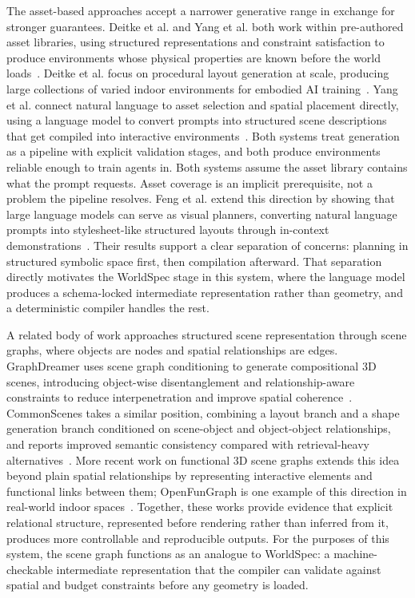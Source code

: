 \documentclass[12pt]{article}
\begin{document}
The asset-based approaches accept a narrower generative range in exchange for stronger guarantees. Deitke et al. and Yang et al. both work within pre-authored asset libraries, using structured representations and constraint satisfaction to produce environments whose physical properties are known before the world loads~\cite{Deitke_2022_NeurIPS, Yang_2024_CVPR}. Deitke et al. focus on procedural layout generation at scale, producing large collections of varied indoor environments for embodied AI training~\cite{Deitke_2022_NeurIPS}. Yang et al. connect natural language to asset selection and spatial placement directly, using a language model to convert prompts into structured scene descriptions that get compiled into interactive environments~\cite{Yang_2024_CVPR}. Both systems treat generation as a pipeline with explicit validation stages, and both produce environments reliable enough to train agents in. Both systems assume the asset library contains what the prompt requests. Asset coverage is an implicit prerequisite, not a problem the pipeline resolves. Feng et al. extend this direction by showing that large language models can serve as visual planners, converting natural language prompts into stylesheet-like structured layouts through in-context demonstrations~\cite{Feng_2023_NeurIPS_LayoutGPT}. Their results support a clear separation of concerns: planning in structured symbolic space first, then compilation afterward. That separation directly motivates the WorldSpec stage in this system, where the language model produces a schema-locked intermediate representation rather than geometry, and a deterministic compiler handles the rest.

A related body of work approaches structured scene representation through scene graphs, where objects are nodes and spatial relationships are edges. GraphDreamer uses scene graph conditioning to generate compositional 3D scenes, introducing object-wise disentanglement and relationship-aware constraints to reduce interpenetration and improve spatial coherence~\cite{Gao_2024_CVPR_GraphDreamer}. CommonScenes takes a similar position, combining a layout branch and a shape generation branch conditioned on scene-object and object-object relationships, and reports improved semantic consistency compared with retrieval-heavy alternatives~\cite{Zhai_2023_NeurIPS_CommonScenes}. More recent work on functional 3D scene graphs extends this idea beyond plain spatial relationships by representing interactive elements and functional links between them; OpenFunGraph is one example of this direction in real-world indoor spaces~\cite{Zhang_2025_CVPR_OpenFunGraph}. Together, these works provide evidence that explicit relational structure, represented before rendering rather than inferred from it, produces more controllable and reproducible outputs. For the purposes of this system, the scene graph functions as an analogue to WorldSpec: a machine-checkable intermediate representation that the compiler can validate against spatial and budget constraints before any geometry is loaded.
\end{document}
